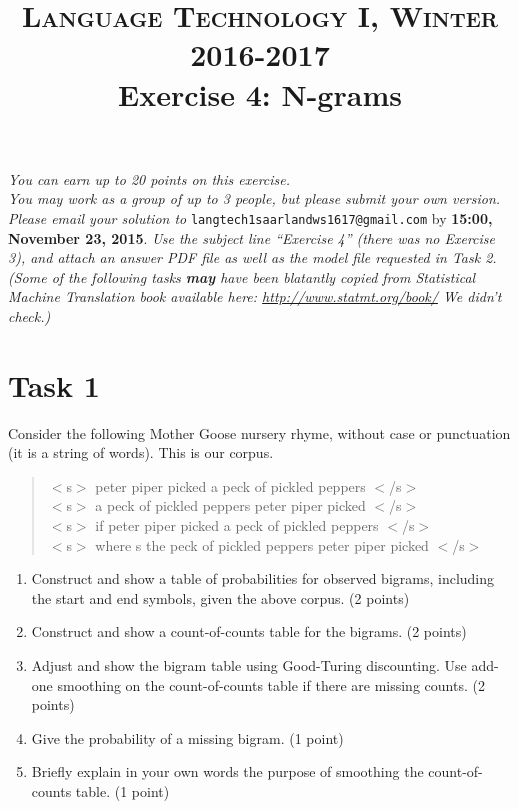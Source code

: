\documentclass[paper=a4, fontsize=11pt]{scrartcl} %
\title{	
\vspace{-1.1cm}
\normalfont \normalsize 
\textsc{Language Technology I, Winter 2016-2017} \\ [25pt] %
\huge Exercise 4: N-grams \\ %
}
\date{} %
\numberwithin{equation}{section} %
\numberwithin{figure}{section} %
\numberwithin{table}{section} %
\begin{document}
\maketitle %


\vspace{-2cm}
\textit{You can earn up to 20 points on this exercise.\\
You may work as a group of up to 3 people, but please submit your own version.
}\\

\textit{Please email your solution to} \texttt{langtech1saarlandws1617@gmail.com} by \textbf{15:00, November 23, 2015}. \textit{Use the subject line ``Exercise 4'' (there was no Exercise 3), and attach an answer PDF file as well as the model file requested in Task 2. (Some of the following tasks \textbf{may} have been blatantly copied from Statistical Machine Translation book available here: \url{http://www.statmt.org/book/} We didn't check.)} \\

\section*{Task 1}
Consider the following Mother Goose nursery rhyme, without case or
punctuation (it is a string of words).  This is our corpus.
\begin{center}
\begin{quotation}
$<$s$>$ peter piper picked a peck of pickled peppers $<$/s$>$\\
$<$s$>$ a peck of pickled peppers peter piper picked $<$/s$>$\\
$<$s$>$ if peter piper picked a peck of pickled peppers $<$/s$>$\\
$<$s$>$ where s the peck of pickled peppers peter piper picked $<$/s$>$
\end{quotation}
\end{center}

\begin{enumerate}
\item Construct and show a table of probabilities for observed
  bigrams, including the start and end symbols, given the above
  corpus. (2 points)
\item Construct and show a count-of-counts table for the bigrams. (2 points)
\item Adjust and show the bigram table using Good-Turing discounting.
  Use add-one smoothing on the count-of-counts table if there are
  missing counts. (2 points)
\item Give the probability of a missing bigram. (1 point)
\item Briefly explain in your own words the purpose of smoothing the
  count-of-counts table. (1 point)
\end{enumerate}
\end{document}
